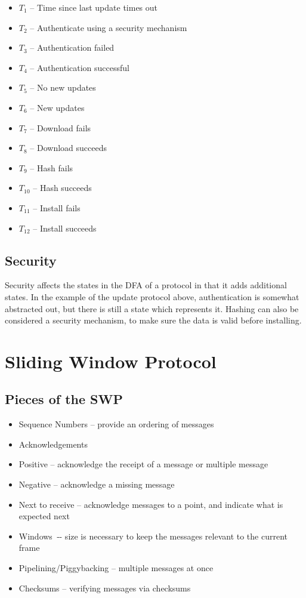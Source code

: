 \documentclass{article}
\begin{document}
\begin{itemize}
    \item $T_{1}$ -- Time since last update times out 
    \item $T_{2}$ -- Authenticate using a security mechanism 
    \item $T_{3}$ -- Authentication failed 
    \item $T_{4}$ -- Authentication successful 
    \item $T_{5}$ -- No new updates
    \item $T_{6}$ -- New updates
    \item $T_{7}$ -- Download fails 
    \item $T_{8}$ -- Download succeeds 
    \item $T_{9}$ -- Hash fails 
    \item $T_{10}$ -- Hash succeeds 
    \item $T_{11}$ -- Install fails 
    \item $T_{12}$ -- Install succeeds
\end{itemize}
\subsection{Security}
Security affects the states in the DFA of a protocol in that it adds additional states. In the example of the update protocol above, authentication is somewhat abstracted out, but there is still a state which represents it. Hashing can also be considered a security mechanism, to make sure the data is valid before installing.  

\section{Sliding Window Protocol}

\subsection{Pieces of the SWP}
\begin{itemize}
\item Sequence Numbers -- provide an ordering of messages
\item Acknowledgements
\item Positive -- acknowledge the receipt of a message or multiple message
\item Negative -- acknowledge a missing message
\item Next to receive -- acknowledge messages to a point, and indicate what is expected next
\item Windows ‐- size is necessary to keep the messages relevant to the current frame
\item Pipelining/Piggybacking -- multiple messages at once
\item Checksums -- verifying messages via checksums
\end{itemize}
\end{document}
